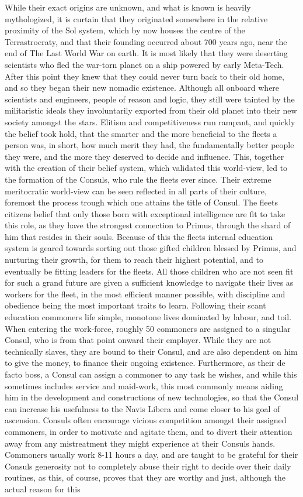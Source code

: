 \documentclass[a4paper,12pt]{report}
\begin{document}
While their exact origins are unknown, and what is known is heavily mythologized, it is curtain that they originated somewhere in the relative proximity of the Sol system, which by now houses the centre of the Terrastrocraty, and that their founding occurred about 700 years ago, near the end of The Last World War on earth. It is most likely that they were deserting scientists who fled the war-torn planet on a ship powered by early Meta-Tech. After this point they knew that they could never turn back to their old home, and so they began their new nomadic existence. Although all onboard where scientists and engineers, people of reason and logic, they still were tainted by the militaristic ideals they involuntarily exported from their old planet into their new society amongst the stars. Elitism and competitiveness run rampant, and quickly the belief took hold, that the smarter and the more beneficial to the fleets a person was, in short, how much merit they had, the fundamentally better people they were, and the more they deserved to decide and influence. This, together with the creation of their belief system, which validated this world-view, led to the formation of the Consuls, who rule the fleets ever since. Their extreme meritocratic world-view can be seen reflected in all parts of their culture, foremost the process trough which one attains the title of Consul. The fleets citizens belief that only those born with exceptional intelligence are fit to take this role, as they have the strongest connection to Primus, through the shard of him that resides in their souls. Because of this the fleets internal education system is geared towards sorting out those gifted children blessed by Primus, and nurturing their growth, for them to reach their highest potential, and to eventually be fitting leaders for the fleets. All those children who are not seen fit for such a grand future are given a sufficient knowledge to navigate their lives as workers for the fleet, in the most efficient manner possible, with discipline and obedience being the most important traits to learn. Following their scant education commoners life simple, monotone lives dominated by labour, and toil. When entering the work-force, roughly 50 commoners are assigned to a singular Consul, who is from that point onward their employer. While they are not technically slaves, they are bound to their Consul, and are also dependent on him to give the money, to finance their ongoing existence. Furthermore, as their de facto boss, a Consul can assign a commoner to any task he wishes, and while this sometimes includes service and maid-work, this most commonly means aiding him in the development and constructions of new technologies, so that the Consul can increase his usefulness to the Navis Libera and come closer to his goal of ascension. Consuls often encourage vicious competition amongst their assigned commoners, in order to motivate and agitate them, and to divert their attention away from any mistreatment they might experience at their Consuls hands. Commoners usually work 8-11 hours a day, and are taught to be grateful for their Consuls generosity not to completely abuse their right to decide over their daily routines, as this, of course, proves that they are worthy and just, although the actual reason for this 
\end{document}
